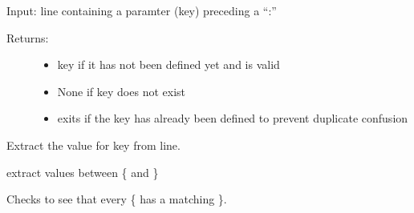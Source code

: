 \documentclass[letterpaper,10pt,english]{sphinxmanual}
\begin{document}
\begin{fulllineitems}
\begin{fulllineitems}
\label{\detokenize{pydfnworks:pydfnworks.helper.input_helper.find_key}}
Input: line containing a paramter (key) preceding a “:”
\begin{description}
\item[{Returns: }] \leavevmode\begin{itemize}
\item {} 
key \textendash{} if it has not been defined yet and is valid

\item {} 
None \textendash{} if key does not exist

\item {} 
exits \textendash{} if the key has already been defined to prevent duplicate confusion

\end{itemize}

\end{description}

\end{fulllineitems}


\begin{fulllineitems}
\label{\detokenize{pydfnworks:pydfnworks.helper.input_helper.find_val}}
Extract the value for key from line.

\end{fulllineitems}


\begin{fulllineitems}
\label{\detokenize{pydfnworks:pydfnworks.helper.input_helper.get_groups}}
extract values between \{ and \}

\end{fulllineitems}


\begin{fulllineitems}
\label{\detokenize{pydfnworks:pydfnworks.helper.input_helper.has_curlys}}
Checks to see that every \{ has a matching \}.


\end{fulllineitems}
\end{fulllineitems}
\end{document}
